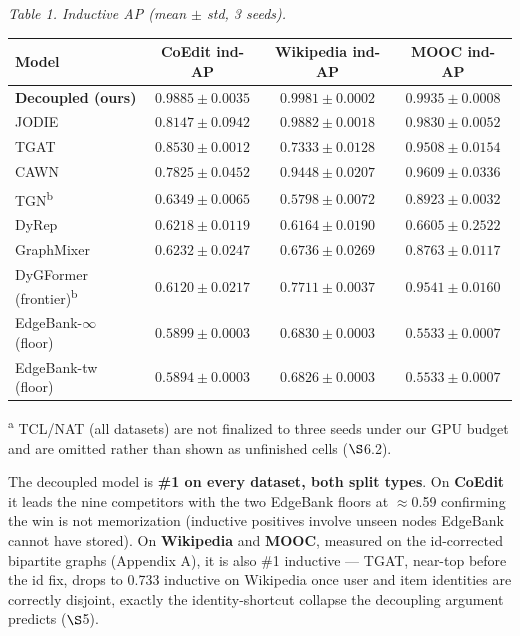 \documentclass[conference]{IEEEtran}
\newcommand{\floatcap}[1]{{\footnotesize\itshape #1\par}}
\begin{document}
\begin{table}[t]
\centering
\floatcap{Table 1. Inductive AP (mean $\pm$ std, 3 seeds).}
\footnotesize
\begin{tabular}{@{}lccc@{}}
\toprule
Model & CoEdit ind-AP & Wikipedia ind-AP & MOOC ind-AP \\
\midrule
\textbf{Decoupled (ours)} & $\mathbf{0.9885 \pm 0.0035}$ & $\mathbf{0.9981 \pm 0.0002}$ & $\mathbf{0.9935 \pm 0.0008}$ \\
JODIE & $0.8147 \pm 0.0942$ & $0.9882 \pm 0.0018$ & $0.9830 \pm 0.0052$ \\
TGAT & $0.8530 \pm 0.0012$ & $0.7333 \pm 0.0128$ & $0.9508 \pm 0.0154$ \\
CAWN & $0.7825 \pm 0.0452$ & $0.9448 \pm 0.0207$ & $0.9609 \pm 0.0336$ \\
TGN\textsuperscript{b} & $0.6349 \pm 0.0065$ & $0.5798 \pm 0.0072$ & $0.8923 \pm 0.0032$ \\
DyRep & $0.6218 \pm 0.0119$ & $0.6164 \pm 0.0190$ & $0.6605 \pm 0.2522$ \\
GraphMixer & $0.6232 \pm 0.0247$ & $0.6736 \pm 0.0269$ & $0.8763 \pm 0.0117$ \\
DyGFormer (frontier)\textsuperscript{b} & $0.6120 \pm 0.0217$ & $0.7711 \pm 0.0037$ & $0.9541 \pm 0.0160$ \\
EdgeBank-$\infty$ (floor) & $0.5899 \pm 0.0003$ & $0.6830 \pm 0.0003$ & $0.5533 \pm 0.0007$ \\
EdgeBank-tw (floor) & $0.5894 \pm 0.0003$ & $0.6826 \pm 0.0003$ & $0.5533 \pm 0.0007$ \\
\bottomrule
\end{tabular}
\par{\footnotesize \textsuperscript{a} TCL/NAT (all datasets) are not finalized to three seeds under our GPU budget and are omitted rather than shown as unfinished cells ($\S$6.2).}
\end{table}

The decoupled model is \textbf{\#1 on every dataset, both split types}. On \textbf{CoEdit} it leads the nine competitors with the two EdgeBank floors at $\approx$0.59 confirming the win is not memorization (inductive positives involve unseen nodes EdgeBank cannot have stored). On \textbf{Wikipedia} and \textbf{MOOC}, measured on the id-corrected bipartite graphs (Appendix A), it is also \#1 inductive --- TGAT, near-top before the id fix, drops to 0.733 inductive on Wikipedia once user and item identities are correctly disjoint, exactly the identity-shortcut collapse the decoupling argument predicts ($\S$5).
\end{document}
